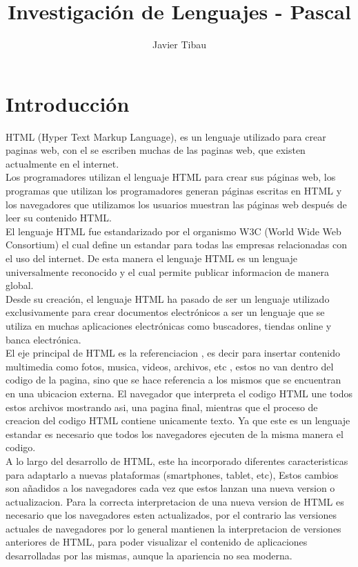 \documentclass[11pt]{article} %
\title{Investigación de Lenguajes - Pascal}
\author{Javier Tibau}
\begin{document}
\maketitle

\section{Introducción}
HTML (Hyper Text Markup Language), es un lenguaje utilizado para crear paginas web, con el se escriben muchas de las paginas web, que existen actualmente en el internet.\\

Los programadores utilizan el lenguaje HTML para crear sus páginas web, los programas que utilizan los programadores generan páginas escritas en HTML y los navegadores que utilizamos los usuarios muestran las páginas web después de leer su contenido HTML.\\
El lenguaje HTML fue estandarizado por el organismo W3C (World Wide Web Consortium) el cual define un estandar para todas las empresas relacionadas con el uso del internet. De esta manera el lenguaje HTML es un lenguaje universalmente reconocido y el cual permite publicar informacion de manera global.\\

Desde su creación, el lenguaje HTML ha pasado de ser un lenguaje utilizado exclusivamente para crear documentos electrónicos a ser un lenguaje que se utiliza en muchas aplicaciones electrónicas como buscadores, tiendas online y banca electrónica.\\

El eje principal de HTML es la referenciacion , es decir para insertar contenido multimedia como fotos, musica, videos, archivos, etc , estos no van dentro del codigo de la pagina, sino que se hace referencia a los mismos que se encuentran en una ubicacion externa. El navegador que interpreta el codigo HTML une todos estos archivos mostrando asi, una pagina final, mientras que el proceso de creacion del codigo HTML contiene unicamente texto. Ya que este es un lenguaje estandar es necesario que todos los navegadores ejecuten de la misma manera el codigo.\\

A lo largo del desarrollo de HTML, este ha incorporado diferentes caracteristicas para adaptarlo a nuevas plataformas (smartphones, tablet, etc), Estos cambios son añadidos a los navegadores cada vez que estos lanzan una nueva version o actualizacion. Para la correcta interpretacion de una nueva version de HTML es necesario que los navegadores esten actualizados, por el contrario las versiones actuales de navegadores por lo general mantienen la interpretacion de versiones anteriores de HTML, para poder visualizar el contenido de aplicaciones desarrolladas por las mismas, aunque la apariencia no sea moderna.\\
\end{document}
